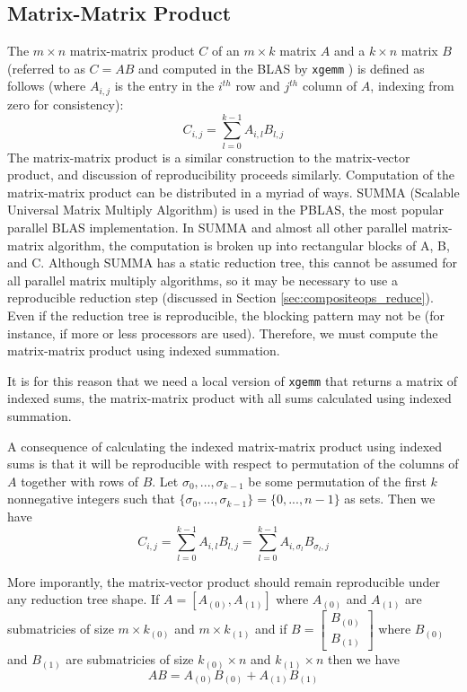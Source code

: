 \subsection{Matrix-Matrix Product}
  \label{sec:compositeops_gemm}
  The $m \times n$ matrix-matrix product $C$ of an $m \times k$ matrix $A$ and a $k \times n$ matrix $B$(referred to as $C = AB$ and computed in the BLAS by \texttt{xgemm} \cite{BLAS}) is defined as follows (where $A_{i, j}$ is the entry in the $i^{th}$ row and $j^{th}$ column of $A$, indexing from zero for consistency):
  \[
    C_{i, j} = \sum\limits_{l = 0}^{k - 1} A_{i, l}B_{l, j}
  \]
  The matrix-matrix product is a similar construction to the matrix-vector product, and discussion of reproducibility proceeds similarly.
  Computation of the matrix-matrix product can be distributed in a myriad of ways. SUMMA (Scalable Universal Matrix Multiply Algorithm) is used in the PBLAS, the most popular parallel BLAS implementation. In SUMMA and almost all other parallel matrix-matrix algorithm, the computation is broken up into rectangular blocks of A, B, and C. Although SUMMA has a static reduction tree, this cannot be assumed for all parallel matrix multiply algorithms, so it may be necessary to use a reproducible reduction step (discussed in Section \ref{sec:compositeops_reduce}).
  Even if the reduction tree is reproducible, the blocking pattern may not be (for instance, if more or less processors are used). Therefore, we must compute the matrix-matrix product using indexed summation.

  It is for this reason that we need a local version of \texttt{xgemm} that returns a matrix of indexed sums, the matrix-matrix product with all sums calculated using indexed summation.

  A consequence of calculating the indexed matrix-matrix product using indexed sums is that it will be reproducible with respect to permutation of the columns of $A$ together with rows of $B$.
  Let $\sigma_0, ..., \sigma_{k - 1}$ be some permutation of the first $k$ nonnegative integers such that $\{\sigma_0, ..., \sigma_{k - 1}\} = \{0, ..., n - 1\}$ as sets. Then we have
  \[
    C_{i, j} = \sum\limits_{l = 0}^{k - 1} A_{i, l}B_{l, j} = \sum\limits_{l = 0}^{k - 1} A_{i, \sigma_l}B_{\sigma_l, j}
  \]

  More imporantly, the matrix-vector product should remain reproducible under any reduction tree shape.
  If $A = [A_{(0)}, A_{(1)}]$ where $A_{(0)}$ and $A_{(1)}$ are submatricies of size $m \times k_{(0)}$ and $m \times k_{(1)}$ and if $B = \left[\begin{array}{c}B_{(0)}\\ B_{(1)}\end{array}\right]$ where $B_{(0)}$ and $B_{(1)}$ are submatricies of size $k_{(0)} \times n$ and $k_{(1)} \times n$ then we have 
  \[
    AB = A_{(0)}B_{(0)} + A_{(1)}B_{(1)}
  \]

